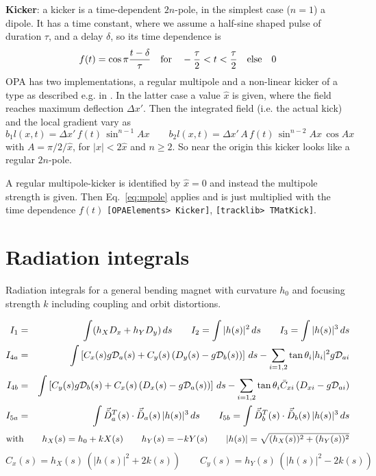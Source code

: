 \documentclass[12pt]{article}
\newcommand\beq{\begin{equation}}
\newcommand\eeq{\end{equation}}
\newcommand{\tilvec}[1]{\vec{\tilde{#1}}}
\newcommand\code[1]{{\tt [#1]}}
\begin{document}
{\bf Kicker}: a kicker is a time-dependent $2n$-pole, in the simplest case ($n=1$) a dipole. It has a time constant, where we assume a half-sine shaped pulse of duration $\tau$, and a delay $\delta$, so its time dependence is
\[
f(t) = \cos \pi \frac{t-\delta}{\tau} \quad\mbox{\rm for}\quad -\frac{\tau}{2}<t<\frac{\tau}{2}
\quad \mbox{\rm else}\quad 0
\]
OPA has two implementations, a regular multipole and a non-linear kicker of a type as described e.g. in \cite{ATKINSON}. In the latter case a value $\hat{x}$ is given, where the field reaches maximum deflection $\Delta x'$. Then the integrated field (i.e. the actual kick) and the local gradient vary as
\beq
b_1l (x,t) = \Delta x' \,f(t)\,\sin^{n-1} Ax  \qquad
b_2l (x,t) = \Delta x'\, A\, f(t)\, \sin^{n-2}Ax\, \cos Ax
\eeq
with $A=\pi/2/\hat x$, for $|x|<2\hat{x}$ and $n\geq 2$. So near the origin this kicker looks like a regular $2n$-pole.

A regular multipole-kicker is identified by $\hat x=0$ and instead the multipole strength is given. Then Eq.~\ref{eq:mpole} applies and is just multiplied with the time dependence $f(t)$ \code{OPAElements> Kicker}, \code{tracklib> TMatKick}.


\section{Radiation integrals}
\begin{table}[t]
\caption{\label{tab:radi}Radiation integrals for a general bending magnet with curvature $h_0$ and focusing strength $k$ including coupling and orbit distortions.}
\begin{eqnarray*}
I_1 & = & \int (h_X D_x +h_Y D_y)\, ds \qquad
I_2 = \int |h(s)|^2\,ds \qquad
I_3 = \int |h(s)|^3\,ds \\
I_{4a} &=& \int
\left[ C_x(s) g {\cal D}_a(s) + C_y(s) \left( D_y(s)-g {\cal D}_b(s)\right) \right]\,ds
-\sum_{i=1,2} \tan\theta_i |h_i|^2 g {\cal D}_{ai} \\
I_{4b} &=& \int
\left[ C_y(s) g {\cal D}_b(s) + C_x(s) \left( D_x(s)-g {\cal D}_a(s)\right) \right]\,ds
-\sum_{i=1,2} \tan\theta_i \bar{C}_{xi}
\left( D_{xi}-g {\cal D}_{ai} \right)  \\
I_{5a} &=& \int \tilvec{D}_a^T (s) \cdot \tilvec{D}_a (s)\,  |h(s)|^3\,ds \qquad
I_{5b} = \int \tilvec{D}_b^T (s) \cdot \tilvec{D}_b (s)\, |h(s)|^3\,ds
\end{eqnarray*}
\[
{\rm with} \qquad h_X(s) = h_0+k X(s) \qquad h_Y(s) = -k Y(s) \qquad |h(s)| = \sqrt{(h_X(s))^2+(h_Y(s))^2}
\]
\[
C_x (s)  =  h_X(s)\,(|h(s)|^2 + 2k(s) ) \qquad
C_y (s)  =  h_Y(s)\,(|h(s)|^2 - 2k(s) ) 
\]
\end{table}
\end{document}
